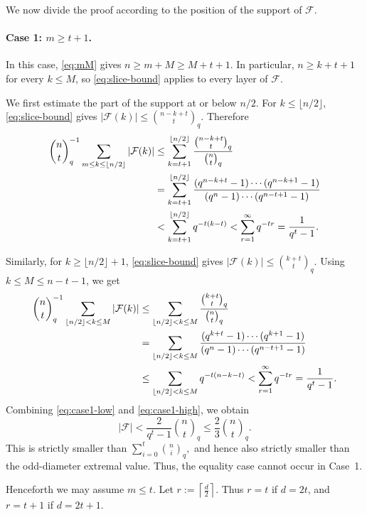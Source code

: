 \documentclass[11pt]{article}
\theoremstyle{definition}
\newcommand{\qbinom}[2]{\genfrac{(}{)}{0pt}{}{#1}{#2}_q}
\begin{document}
We now divide the proof according to the position of the support of $\mathcal F$.

\paragraph{Case 1: $m\ge t+1$.}

In this case, \eqref{eq:mM} gives
\(
n\ge m+M\ge M+t+1.
\)
In particular, $n\ge k+t+1$ for every $k\le M$, so \eqref{eq:slice-bound} applies to every layer of $\mathcal F$.

We first estimate the part of the support at or below $n/2$. 
For $k\le \lfloor n/2\rfloor$, \eqref{eq:slice-bound} gives
\(
|\mathcal F(k)|\le \qbinom{n-k+t}{t}.
\)
Therefore
\begin{align}
\qbinom{n}{t}^{-1}
\sum_{m\le k\le \lfloor n/2\rfloor}|\mathcal F(k)|
&\le
\sum_{k=t+1}^{\lfloor n/2\rfloor}
\frac{\qbinom{n-k+t}{t}}{\qbinom{n}{t}} \notag\\
&=
\sum_{k=t+1}^{\lfloor n/2\rfloor}
\frac{(q^{n-k+t}-1)\cdots(q^{n-k+1}-1)}
{(q^n-1)\cdots(q^{n-t+1}-1)} \notag\\
&<
\sum_{k=t+1}^{\lfloor n/2\rfloor}
q^{-t(k-t)}
<
\sum_{r=1}^{\infty}q^{-tr}
=
\frac{1}{q^t-1}.
\label{eq:case1-low}
\end{align}

Similarly, for $k\ge \lfloor n/2\rfloor+1$, \eqref{eq:slice-bound} gives
\(
|\mathcal F(k)|\le \qbinom{k+t}{t}.
\)
Using $k\le M\le n-t-1$, we get
\begin{align}
\qbinom{n}{t}^{-1}
\sum_{\lfloor n/2\rfloor< k\le M}|\mathcal F(k)|
&\le
\sum_{\lfloor n/2\rfloor<k\le M}
\frac{\qbinom{k+t}{t}}{\qbinom{n}{t}} \notag\\
&=
\sum_{\lfloor n/2\rfloor<k\le M}
\frac{(q^{k+t}-1)\cdots(q^{k+1}-1)}
{(q^n-1)\cdots(q^{n-t+1}-1)} \notag\\
&\le
\sum_{\lfloor n/2\rfloor<k\le M}
q^{-t(n-k-t)}
<
\sum_{r=1}^{\infty}q^{-tr}
=
\frac{1}{q^t-1}.
\label{eq:case1-high}
\end{align}
Combining \eqref{eq:case1-low} and \eqref{eq:case1-high}, we obtain
\begin{equation*}
|\mathcal F|
<
\frac{2}{q^t-1}\qbinom{n}{t}
\le
\frac{2}{3}\qbinom{n}{t}.
\end{equation*}
This is strictly smaller than
\(
\sum_{i=0}^{t}\qbinom{n}{i},
\)
and hence also strictly smaller than the odd-diameter extremal value. 
Thus, the equality case cannot occur in Case~1.

\medskip
Henceforth we may assume \(m\le t.\)
Let
\(
r:=\left\lceil \frac d2\right\rceil.
\)
Thus $r=t$ if $d=2t$, and $r=t+1$ if $d=2t+1$.
\end{document}
